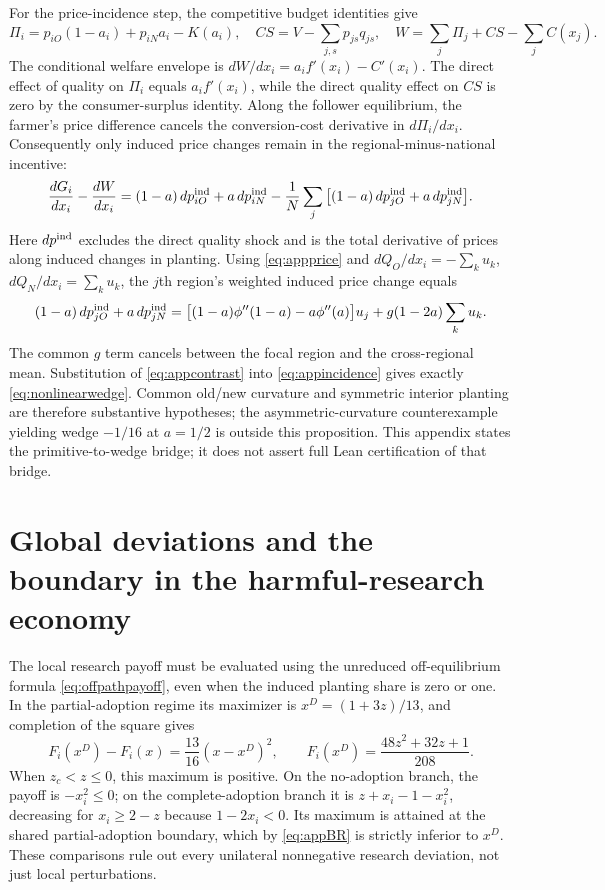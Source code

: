 \documentclass[11pt,a4paper]{article}
\begin{document}
For the price-incidence step, the competitive budget identities give
\[
\Pi_i=p_{iO}(1-a_i)+p_{iN}a_i-K(a_i),\quad
CS=V-\sum_{j,s}p_{js}q_{js},\quad
W=\sum_j\Pi_j+CS-\sum_j C(x_j).
\]
The conditional welfare envelope is $dW/dx_i=a_if'(x_i)-C'(x_i)$. The direct effect of quality on $\Pi_i$ equals $a_if'(x_i)$, while the direct quality effect on $CS$ is zero by the consumer-surplus identity. Along the follower equilibrium, the farmer's price difference cancels the conversion-cost derivative in $d\Pi_i/dx_i$. Consequently only induced price changes remain in the regional-minus-national incentive:
\begin{equation}
\frac{dG_i}{dx_i}-\frac{dW}{dx_i}
=(1-a)\,dp_{iO}^{\rm ind}+a\,dp_{iN}^{\rm ind}
-\frac1N\sum_j\big[(1-a)\,dp_{jO}^{\rm ind}
+a\,dp_{jN}^{\rm ind}\big].
\label{eq:appincidence}
\end{equation}
Here $dp^{\rm ind}$ excludes the direct quality shock and is the total derivative of prices along induced changes in planting. Using \eqref{eq:appprice} and $dQ_O/dx_i=-\sum_k u_k$, $dQ_N/dx_i=\sum_k u_k$, the $j$th region's weighted induced price change equals
\[
(1-a)\,dp_{jO}^{\rm ind}+a\,dp_{jN}^{\rm ind}
=\big[(1-a)\phi''(1-a)-a\phi''(a)\big]u_j
 +g(1-2a)\sum_k u_k.
\]
The common $g$ term cancels between the focal region and the cross-regional mean. Substitution of \eqref{eq:appcontrast} into \eqref{eq:appincidence} gives exactly \eqref{eq:nonlinearwedge}. Common old/new curvature and symmetric interior planting are therefore substantive hypotheses; the asymmetric-curvature counterexample yielding wedge $-1/16$ at $a=1/2$ is outside this proposition. This appendix states the primitive-to-wedge bridge; it does not assert full Lean certification of that bridge.

\section{Global deviations and the boundary in the harmful-research economy}
\label{app:globalP3}
The local research payoff must be evaluated using the unreduced off-equilibrium formula \eqref{eq:offpathpayoff}, even when the induced planting share is zero or one. In the partial-adoption regime its maximizer is $x^D=(1+3z)/13$, and completion of the square gives
\begin{equation}
 F_i(x^D)-F_i(x)=\frac{13}{16}(x-x^D)^2,\qquad
 F_i(x^D)=\frac{48z^2+32z+1}{208}.
 \label{eq:appBR}
\end{equation}
When $z_c<z\leq0$, this maximum is positive. On the no-adoption branch, the payoff is $-x_i^2\leq0$; on the complete-adoption branch it is $z+x_i-1-x_i^2$, decreasing for $x_i\geq2-z$ because $1-2x_i<0$. Its maximum is attained at the shared partial-adoption boundary, which by \eqref{eq:appBR} is strictly inferior to $x^D$. These comparisons rule out every unilateral nonnegative research deviation, not just local perturbations.
\end{document}
